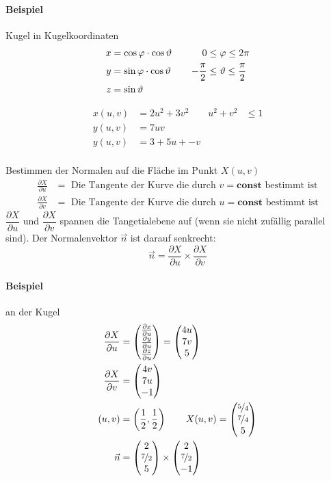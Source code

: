 \paragraph*{Beispiel} Kugel in Kugelkoordinaten
\begin{align*}
 x &= \cos \varphi \cdot \cos \vartheta & \vline && 0 &\le \varphi \le 2\pi\\
 y &= \sin \varphi \cdot \cos \vartheta & \vline && -\frac{\pi}{2} &\le \vartheta \le \frac{\pi}{2}\\
 z &= \sin \vartheta & \vline &&
\end{align*}
\begin{center}
\end{center}
\begin{align*}
 x(u,v) &= 2 u^2 + 3 v^2 &
 u^2 + v^2 & \le 1 \\
 y(u,v) &= 7uv\\
 y(u,v) &= 3 + 5 u + - v\\
\end{align*}
\begin{center}
\end{center}

Bestimmen der Normalen auf die Fläche im Punkt $X(u,v)$
\begin{align*}
	\frac{\partial X}{\partial u} &= \text{ Die Tangente der Kurve die durch $v = \mathbf{const}$ bestimmt ist}\\
	\frac{\partial X}{\partial v} &= \text{ Die Tangente der Kurve die durch $u = \mathbf{const}$ bestimmt ist}
\end{align*}
$\dfrac{\partial X}{\partial u}$ und $\dfrac{\partial X}{\partial v}$ spannen die Tangetialebene auf (wenn sie nicht
	zufällig parallel sind). Der Normalenvektor $\vec n$ ist darauf senkrecht:
	\[\vec n = \dfrac{\partial X}{\partial u} \times \dfrac{\partial X}{\partial v}\]
\paragraph*{Beispiel} an der Kugel
\begin{align*}
 \frac{\partial X}{\partial u} &= \begin{pmatrix}\frac{\partial x}{\partial u}\\\frac{\partial y}{\partial u}\\\frac{\partial z}{\partial u}\end{pmatrix} = \begin{pmatrix}4u\\7v\\5\end{pmatrix}\\
 \frac{\partial X}{\partial v} &= \begin{pmatrix}4v\\7u\\-1\end{pmatrix}\\
 (u,v) &= \left(\frac{1}{2}, \frac{1}{2}\right) \qquad X(u,v) = \begin{pmatrix}\nicefrac{5}{4}\\\nicefrac{7}{4}\\5\end{pmatrix}\\
 \vec n &= \begin{pmatrix}2\\\nicefrac{7}{2}\\5\end{pmatrix} \times \begin{pmatrix}2\\\nicefrac{7}{2}\\-1\end{pmatrix}
\end{align*}

